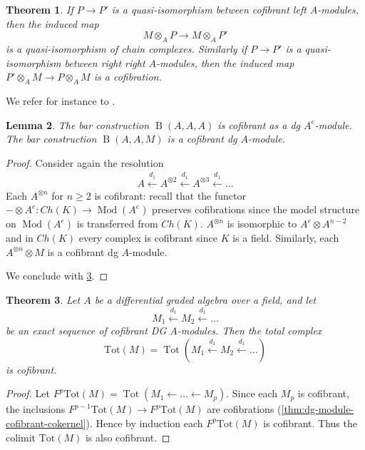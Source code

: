 \documentclass{scrartcl}
\theoremstyle{plain}
\newtheorem{theorem}{Theorem}[section]
\newtheorem{lemma}[theorem]{Lemma}
\theoremstyle{definition}
\DeclareMathOperator{\Tot}{Tot}
\newcommand{\from}{\leftarrow}
\let\xfrom\xleftarrow
\DeclareMathOperator{\Mod}{Mod}
\DeclareMathOperator{\BC}{B}
\newcommand{\blank}{-}
\begin{document}
\begin{theorem}\label{thm:tensor-product-quasi-iso}
    If $P\to P'$ is a quasi-isomorphism between cofibrant left $A$-modules, then the induced map
    $$M\otimes_A P\to M\otimes_A P'$$
    is a quasi-isomorphism of chain complexes. Similarly if $P\to P'$ is a quasi-isomorphism between right right $A$-modules, then the induced map $P'\otimes_A M\to P\otimes_A M$ is a cofibration. 
\end{theorem}
We refer for instance to \cite[3.2]{hinich1997homological}. 

\begin{lemma}\label{lem:bar-cofibrant}
    The bar construction $\BC(A, A, A)$ is cofibrant as a dg $A^e$-module. The bar construction $\BC(A, A, M)$ is a cofibrant dg $A$-module.
\end{lemma}
\begin{proof}
    Consider again the resolution
    \begin{align*}
        A \xfrom{d_1} A^{\otimes 2} \xfrom{d_1} A^{\otimes 3} \xfrom{d_1} \dots
    \end{align*}
    Each $A^{\otimes n}$ for $n\geq 2$ is cofibrant: recall that the functor $\blank\otimes A^e\colon Ch(K)\to \Mod(A^e)$ preserves cofibrations since the model structure on $\Mod(A^e)$ is transferred from $Ch(K)$. $A^{\otimes n}$ is isomorphic to $A^e \otimes A^{n-2}$ and in $Ch(K)$ every complex is cofibrant since $K$ is a field. Similarly, each $A^{\otimes n}\otimes M$ is a cofibrant dg $A$-module.

    We conclude with \cref{prop:cofibrant-resolution-dga-mod}. 
\end{proof}

\begin{theorem}\label{prop:cofibrant-resolution-dga-mod}
    Let $A$ be a differential graded algebra over a field, and let $$M_1\xfrom{d_1} M_2\xfrom{d_1}\dots$$ be an exact sequence of cofibrant DG $A$-modules. Then the total complex $$\mathrm{Tot}(M)=\Tot(M_1\xfrom{d_1} M_2\xfrom{d_1} \dots)$$ is cofibrant.
\end{theorem}

\begin{proof}
    Let $F^p\mathrm{Tot}(M) = \Tot(M_1\from\dots\from M_p)$. Since each $M_p$ is cofibrant, the inclusions $F^{p-1}\mathrm{Tot}(M) \to F^p\mathrm{Tot}(M)$ are cofibrations (\ref{thm:dg-module-cofibrant-cokernel}). Hence by induction each $F^p\mathrm{Tot}(M)$ is cofibrant. Thus the colimit $\mathrm{Tot}(M)$ is also cofibrant. 
\end{proof}
\end{document}
